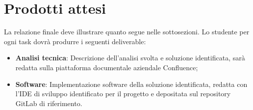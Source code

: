 \section{Prodotti attesi}
La relazione finale deve illustrare quanto segue nelle sottosezioni.
Lo studente per ogni task dovrà produrre i seguenti deliverable:
\begin{itemize}
	\item \textbf{Analisi tecnica}: Descrizione dell’analisi svolta e soluzione identificata, sarà redatta sulla piattaforma documentale aziendale Confluence;
	\item \textbf{Software}: Implementazione software della soluzione identificata, redatta con l’IDE di sviluppo identificato per il progetto e depositata sul repository GitLab di riferimento.
\end{itemize}
